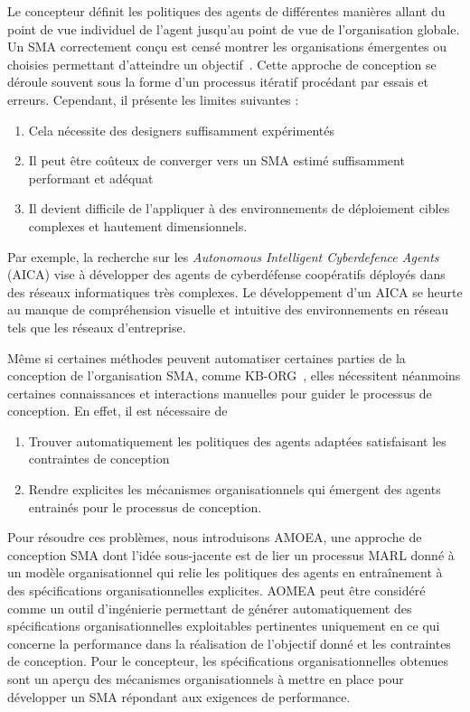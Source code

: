 \documentclass[contribution]{jfsma}
\begin{document}
Le concepteur définit les politiques des agents de différentes manières allant du point de vue individuel de l'agent jusqu'au point de vue de l'organisation globale. Un SMA correctement conçu est censé montrer les organisations émergentes ou choisies permettant d'atteindre un objectif~\cite{Picard2009}. Cette approche de conception se déroule souvent sous la forme d’un processus itératif procédant par essais et erreurs. Cependant, il présente les limites suivantes :

\begin{enumerate}[label=\roman*),itemjoin={;\quad}]
  \item Cela nécessite des designers suffisamment expérimentés
  \item Il peut être coûteux de converger vers un SMA estimé suffisamment performant et adéquat
  \item Il devient difficile de l'appliquer à des environnements de déploiement cibles complexes et hautement dimensionnels.
\end{enumerate}

Par exemple, la recherche sur les \emph{Autonomous Intelligent Cyberdefence Agents}~\cite{Kott2023} (AICA) vise à développer des agents de cyberdéfense coopératifs déployés dans des réseaux informatiques très complexes. Le développement d'un AICA se heurte au manque de compréhension visuelle et intuitive des environnements en réseau tels que les réseaux d'entreprise.


Même si certaines méthodes peuvent automatiser certaines parties de la conception de l'organisation SMA, comme KB-ORG~\cite{Sims2008}, elles nécessitent néanmoins certaines connaissances et interactions manuelles pour guider le processus de conception. En effet, il est nécessaire de
\begin{enumerate}[label=\roman*),itemjoin={; et \ }]
  \item Trouver automatiquement les politiques des agents adaptées satisfaisant les contraintes de conception
  \item Rendre explicites les mécanismes organisationnels qui émergent des agents entrainés pour le processus de conception.
\end{enumerate}


Pour résoudre ces problèmes, nous introduisons AMOEA, une approche de conception SMA dont l'idée sous-jacente est de lier un processus MARL donné à un modèle organisationnel qui relie les politiques des agents en entraînement à des spécifications organisationnelles explicites. AOMEA peut être considéré comme un outil d'ingénierie permettant de générer automatiquement des spécifications organisationnelles exploitables pertinentes uniquement en ce qui concerne la performance dans la réalisation de l'objectif donné et les contraintes de conception. Pour le concepteur, les spécifications organisationnelles obtenues sont un aperçu des mécanismes organisationnels à mettre en place pour développer un SMA répondant aux exigences de performance.
\end{document}
